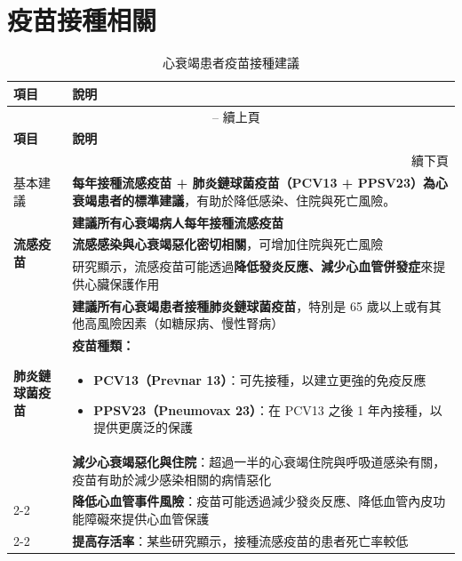 \documentclass[nols]{tufte-book}
\begin{document}
\chapter{疫苗接種相關}
\begin{longtable}{|p{}|p{}|}
\caption{心衰竭患者疫苗接種建議} \label{tab:vaccine} \\
\hline
\textbf{項目} & \textbf{說明} \\
\hline
\endfirsthead

\multicolumn{2}{c}{\tablename\ \thetable{} -- 續上頁} \\
\hline
\textbf{項目} & \textbf{說明} \\
\hline
\endhead

\hline
\multicolumn{2}{r}{續下頁} \\
\endfoot

\hline
\endlastfoot

基本建議 & \textbf{每年接種流感疫苗 + 肺炎鏈球菌疫苗（PCV13 + PPSV23）為心衰竭患者的標準建議}，有助於降低感染、住院與死亡風險。 \\
\hline

\multirow{3}{*}{\textbf{流感疫苗}} & \textbf{建議所有心衰竭病人每年接種流感疫苗} \\ 
\cline{2-2}
& \textbf{流感感染與心衰竭惡化密切相關}，可增加住院與死亡風險 \\
\cline{2-2}
& 研究顯示，流感疫苗可能透過\textbf{降低發炎反應、減少心血管併發症}來提供心臟保護作用 \\
\hline

\multirow{4}{*}{\textbf{肺炎鏈球菌疫苗}} & \textbf{建議所有心衰竭患者接種肺炎鏈球菌疫苗}，特別是 65 歲以上或有其他高風險因素（如糖尿病、慢性腎病） \\
\cline{2-2}
& \textbf{疫苗種類：} \\
& \begin{itemize}
\item \textbf{PCV13（Prevnar 13）}：可先接種，以建立更強的免疫反應
\item \textbf{PPSV23（Pneumovax 23）}：在 PCV13 之後 1 年內接種，以提供更廣泛的保護
\end{itemize} \\
\hline

\multirow{3}{*}{疫苗的潛在好處} & \textbf{減少心衰竭惡化與住院}：超過一半的心衰竭住院與呼吸道感染有關，疫苗有助於減少感染相關的病情惡化 \\
\cline{2-2}
& \textbf{降低心血管事件風險}：疫苗可能透過減少發炎反應、降低血管內皮功能障礙來提供心血管保護 \\
\cline{2-2}
& \textbf{提高存活率}：某些研究顯示，接種流感疫苗的患者死亡率較低 \\

\end{longtable}
\end{document}
